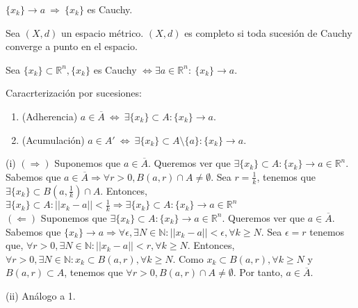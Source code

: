\begin{obs}
$\{ x_k \} \rightarrow a \ \Rightarrow \ \{ x_k \}$ es Cauchy.
\end{obs}

\begin{defn}
Sea $(X,d)$ un espacio métrico. $(X,d)$ es completo si toda sucesión de Cauchy converge a punto en el espacio.
\end{defn}

\begin{theo}
Sea $\{x_k\} \subset \mathbb{R}^n, \{x_k\}$ es Cauchy $ \Leftrightarrow \exists a \in \mathbb{R}^n: \ \{x_k\} \rightarrow a$.
\end{theo}

\begin{prop}
Caracrterización por sucesiones:
\begin{enumerate}[label=(\roman*)]
    \item (Adherencia) $a \in \overline{A} \ \Leftrightarrow \ \exists \{x_k\} \subset A: \{x_k\} \rightarrow a$.
    \item (Acumulación) $a \in A' \ \Leftrightarrow \ \exists \{x_k\} \subset A\setminus\{a\}: \{x_k\} \rightarrow a$.
\end{enumerate}
\end{prop}

\begin{dem}(i)
    $(\Rightarrow)$ Suponemos que $a\in\overline{A}$. Queremos ver que $\exists \{x_k\}\subset A: \{x_k\} \rightarrow a \in\mathbb{R}^n$. Sabemos que $a\in\overline{A} \Rightarrow \forall r>0, B(a,r)\cap A \neq \emptyset$. Sea $ r = \frac{1}{k}$, tenemos que $\exists \{x_k\} \subset B(a,\frac{1}{k})\cap A$. Entonces, $\exists \{x_k\} \subset A: ||x_k - a||<\frac{1}{k} \Rightarrow \exists \{x_k\}\subset A: \{x_k\} \rightarrow a \in\mathbb{R}^n$\\
    
    $(\Leftarrow)$ Suponemos que  $\exists \{x_k\}\subset A: \{x_k\} \rightarrow a \in\mathbb{R}^n$. Queremos ver que $a\in\overline{A}$. Sabemos que $\{x_k\} \rightarrow a \Rightarrow \forall \epsilon, \exists N\in\mathbb{N}: ||x_k-a||<\epsilon, \forall k\geq N$. Sea $\epsilon = r$ tenemos que, $\forall r > 0, \exists N\in\mathbb{N}: ||x_k -a|| < r, \forall k\geq N$. Entonces,  $\forall r>0, \exists N\in\mathbb{N}: x_k \subset B(a,r), \forall k\geq N$. Como $x_k \subset B(a,r), \forall k\geq N$ y $B(a,r)\subset A$, tenemos que $\forall r>0, B(a,r)\cap A \neq \emptyset$. Por tanto, $a\in\overline{A}$.
\end{dem}
\begin{dem}(ii)
    Análogo a 1. 
\end{dem}


